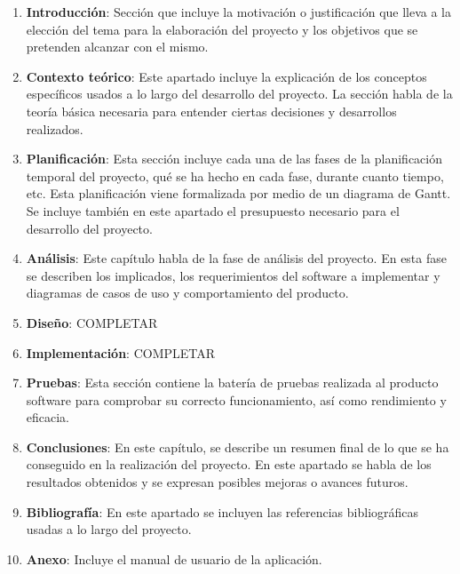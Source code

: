\begin{enumerate}
	\item \textbf{Introducción}:
	Sección que incluye la motivación o justificación que lleva a la elección del tema para la elaboración del proyecto y los objetivos que se pretenden alcanzar con el mismo. 
	\item \textbf{Contexto teórico}:
	Este apartado incluye la explicación de los conceptos específicos usados a lo largo del desarrollo del proyecto. La sección habla de la teoría básica necesaria para entender ciertas decisiones y desarrollos realizados.
	\item \textbf{Planificación}: 
	Esta sección incluye cada una de las fases de la planificación temporal del proyecto, qué se ha hecho en cada fase, durante cuanto tiempo, etc. Esta planificación viene formalizada por medio de un diagrama de Gantt. Se incluye también en este apartado el presupuesto necesario para el desarrollo del proyecto.
	\item \textbf{Análisis}: 
	Este capítulo habla de la fase de análisis del proyecto. En esta fase se describen los implicados, los requerimientos del software a implementar y diagramas de casos de uso y comportamiento del producto.
	\item \textbf{Diseño}: 
	COMPLETAR
	\item \textbf{Implementación}: 
	COMPLETAR 
	\item \textbf{Pruebas}: 
	Esta sección contiene la batería de pruebas realizada al producto software para comprobar su correcto funcionamiento, así como rendimiento y eficacia.
	\item \textbf{Conclusiones}: 
	En este capítulo, se describe un resumen final de lo que se ha conseguido en la realización del proyecto. En este apartado se habla de los resultados obtenidos y se expresan posibles mejoras o avances futuros.
	\item \textbf{Bibliografía}: 
	En este apartado se incluyen las referencias bibliográficas usadas a lo largo del proyecto.
	\item \textbf{Anexo}: 
	Incluye el manual de usuario de la aplicación.
\end{enumerate}